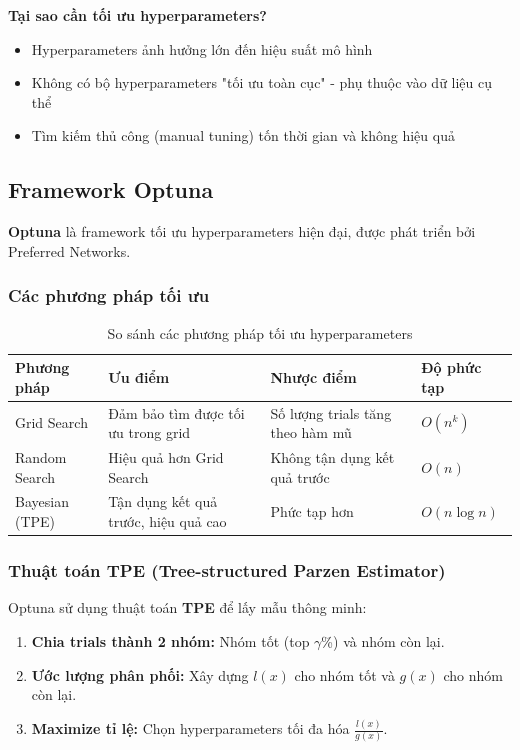 \documentclass[12pt,a4paper]{article}
\begin{document}
\textbf{Tại sao cần tối ưu hyperparameters?}
\begin{itemize}
    \item Hyperparameters ảnh hưởng lớn đến hiệu suất mô hình
    \item Không có bộ hyperparameters "tối ưu toàn cục" - phụ thuộc vào dữ liệu cụ thể
    \item Tìm kiếm thủ công (manual tuning) tốn thời gian và không hiệu quả
\end{itemize}

\subsection{Framework Optuna}

\textbf{Optuna} là framework tối ưu hyperparameters hiện đại, được phát triển bởi Preferred Networks.

\subsubsection{Các phương pháp tối ưu}

\begin{table}[H]
\centering
\caption{So sánh các phương pháp tối ưu hyperparameters}
\label{tab:optimization_methods}
\begin{tabular}{|l|p{4cm}|p{4cm}|p{3cm}|}
\hline
\textbf{Phương pháp} & \textbf{Ưu điểm} & \textbf{Nhược điểm} & \textbf{Độ phức tạp} \\
\hline
Grid Search & Đảm bảo tìm được tối ưu trong grid & Số lượng trials tăng theo hàm mũ & $O(n^k)$ \\
\hline
Random Search & Hiệu quả hơn Grid Search & Không tận dụng kết quả trước & $O(n)$ \\
\hline
Bayesian (TPE) & Tận dụng kết quả trước, hiệu quả cao & Phức tạp hơn & $O(n \log n)$ \\
\hline
\end{tabular}
\end{table}

\subsubsection{Thuật toán TPE (Tree-structured Parzen Estimator)}

Optuna sử dụng thuật toán \textbf{TPE} để lấy mẫu thông minh:

\begin{enumerate}
    \item \textbf{Chia trials thành 2 nhóm:} Nhóm tốt (top $\gamma$\%) và nhóm còn lại.
    \item \textbf{Ước lượng phân phối:} Xây dựng $l(x)$ cho nhóm tốt và $g(x)$ cho nhóm còn lại.
    \item \textbf{Maximize tỉ lệ:} Chọn hyperparameters tối đa hóa $\frac{l(x)}{g(x)}$.
\end{enumerate}
\end{document}
